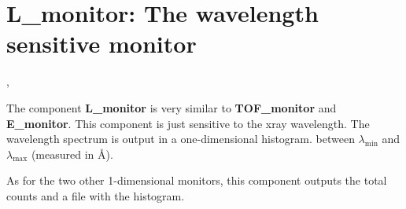

\section{L\_monitor: The wavelength sensitive monitor}
\label{s:L_monitor}

,{}


The component \textbf{L\_monitor} is very similar to
\textbf{TOF\_monitor} and \textbf{E\_monitor}.
This component is just sensitive to the xray wavelength.
The wavelength spectrum is output in a one-dimensional histogram.
between $\lambda_\mathrm{min}$ and $\lambda_\mathrm{max}$ (measured in \AA ).

As for the two other 1-dimensional monitors, this component outputs
the total counts and a file with the histogram.

